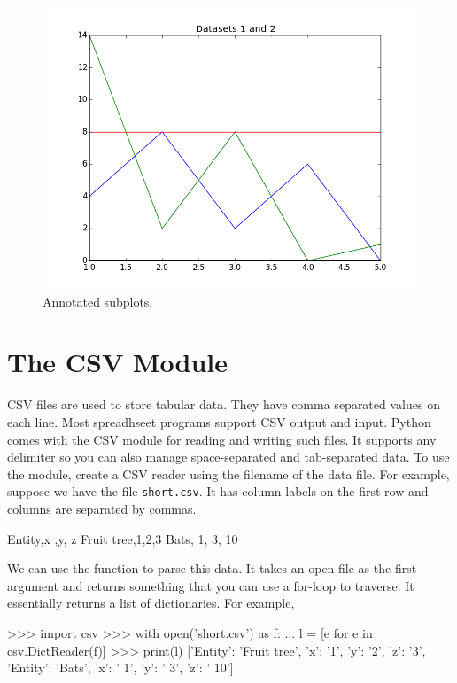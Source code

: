 \documentclass[11pt]{cselabheader}
\begin{document}
\begin{figure}[H]
  \centering
  \includegraphics[width=\textwidth]{img/matplotlib_overlayed.png}
  \caption{Annotated subplots.}
\end{figure}

\section{The CSV Module}
CSV files are used to store tabular data. They have comma separated values on
each line. Most spreadhseet programs support CSV output and input. Python comes
with the CSV module for reading and writing such files. It supports any
delimiter so you can also manage space-separated and tab-separated data. To
use the module, create a CSV reader using the filename of the data file. For
example, suppose we have the file \texttt{short.csv}. It has column labels
on the first row and columns are separated by commas.

\begin{verbatimcode}
Entity,x         ,y,  z
Fruit tree,1,2,3
Bats, 1, 3, 10
\end{verbatimcode}

We can use the  function to parse this data.
It takes an open file as the first argument and returns something that you
can use a for-loop to traverse. It essentially returns a list of dictionaries.
For example,

\begin{pyconcode}
>>> import csv
>>> with open('short.csv') as f:
...     l = [e for e in csv.DictReader(f)]
>>> print(l)
[{'Entity': 'Fruit tree', 'x': '1', 'y': '2', 'z': '3'},
 {'Entity': 'Bats', 'x': ' 1', 'y': ' 3', 'z': ' 10'}]
\end{pyconcode}
\end{document}
